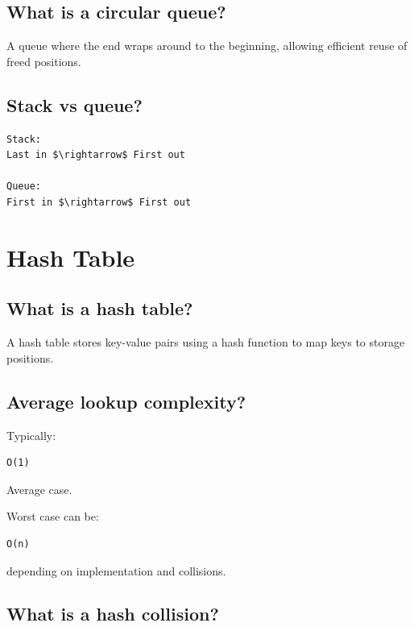 \medskip

\subsection{What is a circular queue?}

A queue where the end wraps around to the beginning, allowing efficient reuse of freed positions.

\medskip

\subsection{Stack vs queue?}

\begin{lstlisting}
Stack:
Last in $\rightarrow$ First out

Queue:
First in $\rightarrow$ First out
\end{lstlisting}

\medskip

\section{Hash Table}

\subsection{What is a hash table?}

A hash table stores key-value pairs using a hash function to map keys to storage positions.

\medskip

\subsection{Average lookup complexity?}

Typically:

\begin{lstlisting}
O(1)
\end{lstlisting}

Average case.

Worst case can be:

\begin{lstlisting}
O(n)
\end{lstlisting}

depending on implementation and collisions.

\medskip

\subsection{What is a hash collision?}

